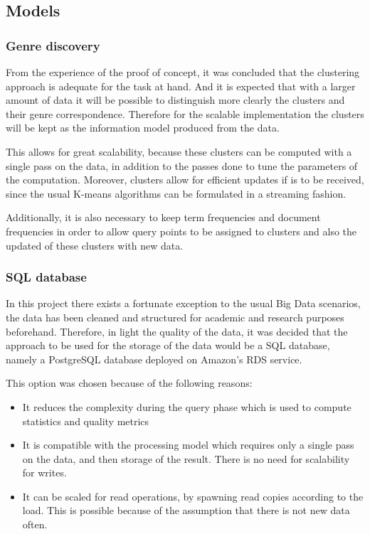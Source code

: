 \documentclass[10pt,a4paper]{scrartcl}
\begin{document}
    \subsection{Models}
    \subsubsection{Genre discovery}
    
    From the experience of the proof of concept, it was concluded that the
    clustering approach is adequate for the task at hand. And it is expected
    that with a larger amount of data it will be possible to distinguish
    more clearly the clusters and their genre correspondence. Therefore
    for the scalable implementation the clusters will be kept as the information
    model produced from the data.
    
    This allows for great scalability, because these clusters can be computed
    with a single pass on the data, in addition to the passes done to tune
    the parameters of the computation. Moreover, clusters allow for efficient
    updates if is to be received, since the usual K-means algorithms can
    be formulated in a streaming fashion.
    
    Additionally, it is also necessary to keep term frequencies and
    document frequencies in order to allow query points to be assigned
    to clusters and also the updated of these clusters with new data.
    
    \subsubsection{SQL database}
    In this project there exists a fortunate exception to the usual Big Data
    scenarios, the data has been cleaned and structured for academic and
    research purposes beforehand. Therefore, in light the quality of the data,
    it was decided that the approach to be used for the storage of the data would
    be a SQL database, namely a PostgreSQL database deployed on Amazon's RDS
    service.
 
    This option was chosen because of the following reasons:
 
    \begin{itemize}
      \item It reduces the complexity during the query phase which is used to
            compute statistics and quality metrics
      \item It is compatible with the processing model which requires only a
            single pass on the data, and then storage of the result. There
            is no need for scalability for writes.
      \item It can be scaled for read operations, by spawning read copies
            according to the load. This is possible because of the assumption
            that there is not new data often.
    \end{itemize}        
 
\end{document}
